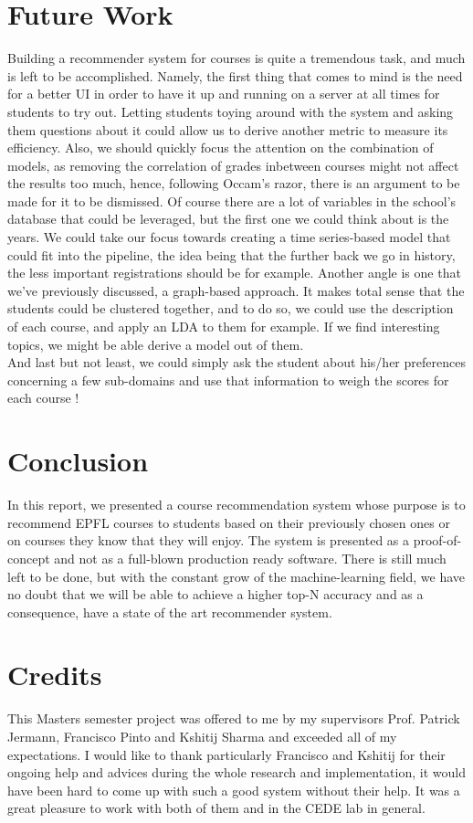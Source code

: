 \documentclass{article}
\begin{document}
\newpage
\section{Future Work}
    Building a recommender system for courses is quite a tremendous task, and much is left to be accomplished. Namely, the first thing that comes to mind is the need for a better UI in order to have it up and running on a server at all times for students to try out. Letting students toying around with the system and asking them questions about it could allow us to derive another metric to measure its efficiency. Also, we should quickly focus the attention on the combination of models, as removing the correlation of grades inbetween courses might not affect the results too much, hence, following Occam's razor, there is an argument to be made for it to be dismissed. Of course there are a lot of variables in the school's database that could be leveraged, but the first one we could think about is the years. We could take our focus towards creating a time series-based model that could fit into the pipeline, the idea being that the further back we go in history, the less important registrations should be for example. Another angle is one that we've previously discussed, a graph-based approach. It makes total sense that the students could be clustered together, and to do so, we could use the description of each course, and apply an LDA to them for example. If we find interesting topics, we might be able derive a model out of them.
    \\And last but not least, we could simply ask the student about his/her preferences concerning a few sub-domains and use that information to weigh the scores for each course !

\section{Conclusion}
    In this report, we presented a course recommendation system whose purpose is to recommend EPFL courses to students based on their previously chosen ones or on courses they know that they will enjoy. The system is presented as a proof-of-concept and not as a full-blown production ready software. There is still much left to be done, but with the constant grow of the machine-learning field, we have no doubt that we will be able to achieve a higher top-N accuracy and as a consequence, have a state of the art recommender system.

\newpage
\section{Credits}
    This Masters semester project was offered to me by my supervisors Prof. Patrick Jermann, Francisco Pinto and Kshitij Sharma and exceeded all of my expectations. I would like to thank particularly Francisco and Kshitij for their ongoing help and advices during the whole research and implementation, it would have been hard to come up with such a good system without their help. It was a great pleasure to work with both of them and in the CEDE\cite{cede} lab in general.
\end{document}
